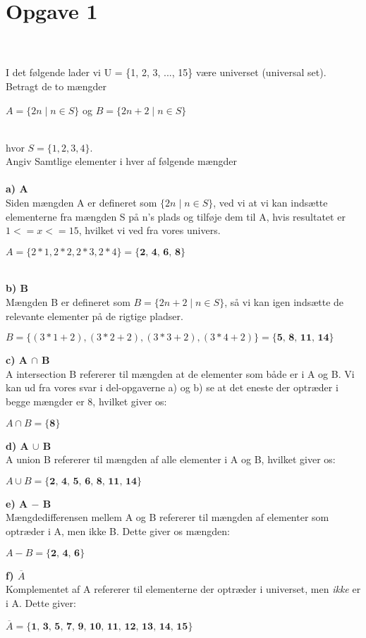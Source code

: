 \section*{Opgave 1}

\\
\\
I det følgende lader vi U = \{1, 2, 3, ..., 15\} være universet (universal set).
\\
Betragt de to mængder
\begin{center}
    \( A = \{ 2n \mid n \in S \} \) og \( B = \{ 2n + 2 \mid n \in S \} \)
\end{center}
\\
hvor \(S = \{1, 2, 3, 4\}.\)
\\
Angiv Samtlige elementer i hver af følgende mængder
\\
\\
\textbf{a) A}\\
Siden mængden A er defineret som \(\{ 2n \mid n \in S \}\), ved vi at vi kan indsætte elementerne fra mængden S på n's plads og tilføje dem til A, hvis resultatet er \(1 <= x <= 15\), hvilket vi ved fra vores univers.
\begin{center}
\(A = \{2*1, 2*2, 2*3, 2*4\} = \textbf{\{2, 4, 6, 8\}}\) \\
\end{center}
\\
\textbf{b) B}\\
Mængden B er defineret som \(B = \{2n + 2 \mid n \in S\}\), så vi kan igen indsætte de relevante elementer på de rigtige pladser. 
\begin{center}
    \(B = \{(3*1+2), (3*2+2), (3*3+2), (3*4+2)\} = \textbf{\{5, 8, 11, 14\}}\)
\end{center}
\textbf{c) A \(\cap\) B}\\
A intersection B refererer til mængden at de elementer som både er i A og B. Vi kan ud fra vores svar i del-opgaverne a) og b) se at det eneste der optræder i begge mængder er 8, hvilket giver os: 
\begin{center}
    \(A \cap B = \textbf{\{8\}}\) \\
\end{center}
\textbf{d) A \(\cup\) B}\\
A union B refererer til mængden af alle elementer i A og B, hvilket giver os: 
\begin{center}
    \(A \cup B = \textbf{\{2, 4, 5, 6, 8, 11, 14\}}\)
\end{center}
\textbf{e) A \( - \) B}\\
Mængdedifferensen mellem A og B refererer til mængden af elementer som optræder i A, men ikke B. Dette giver os mængden:
\begin{center}
    \(A - B = \textbf{\{2, 4, 6\}}\)
\end{center}
\textbf{f) \(\overline{A}\)} \\
Komplementet af A refererer til elementerne der optræder i universet, men \textit{ikke} er i A. Dette giver:
\begin{center}
    \(\overline{A} = \textbf{\{1, 3, 5, 7, 9, 10, 11, 12, 13, 14, 15\}}\)
\end{center}
\\
\\